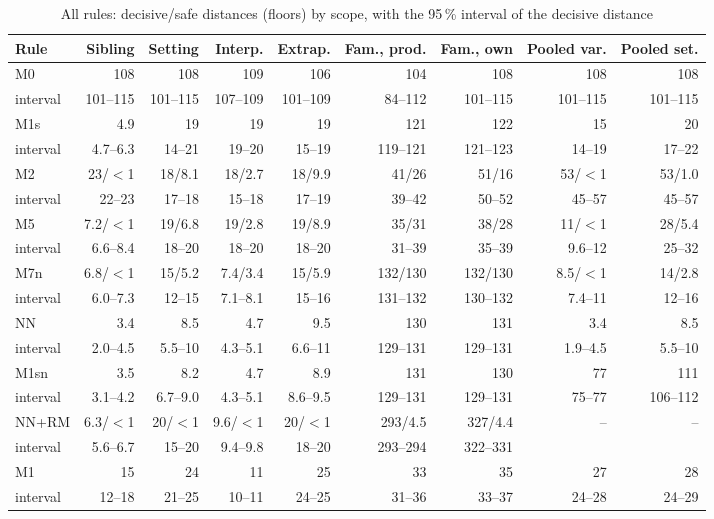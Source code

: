\documentclass[pdflatex,sn-basic]{sn-jnl}
\newcommand{\tabsizesmall}{\footnotesize}
\begin{document}
\FloatBarrier

\begin{table}[p]
\tabsizesmall
\setlength{\tabcolsep}{2pt}
\caption{All rules: decisive/safe distances (floors) by scope, with the 95\,\% interval of the decisive distance}\label{tab:s-all}
\begin{tabular}{@{}lrrrrrrrr@{}}
\toprule
Rule & Sibling & Setting & Interp. & Extrap. & Fam., prod. & Fam., own & Pooled var. & Pooled set. \\
\midrule
M0 & 108 & 108 & 109 & 106 & 104 & 108 & 108 & 108 \\
\quad interval & 101--115 & 101--115 & 107--109 & 101--109 & 84--112 & 101--115 & 101--115 & 101--115 \\
M1s & 4.9 & 19 & 19 & 19 & 121 & 122 & 15 & 20 \\
\quad interval & 4.7--6.3 & 14--21 & 19--20 & 15--19 & 119--121 & 121--123 & 14--19 & 17--22 \\
M2 & 23/$<$1 & 18/8.1 & 18/2.7 & 18/9.9 & 41/26 & 51/16 & 53/$<$1 & 53/1.0 \\
\quad interval & 22--23 & 17--18 & 15--18 & 17--19 & 39--42 & 50--52 & 45--57 & 45--57 \\
M5 & 7.2/$<$1 & 19/6.8 & 19/2.8 & 19/8.9 & 35/31 & 38/28 & 11/$<$1 & 28/5.4 \\
\quad interval & 6.6--8.4 & 18--20 & 18--20 & 18--20 & 31--39 & 35--39 & 9.6--12 & 25--32 \\
M7n & 6.8/$<$1 & 15/5.2 & 7.4/3.4 & 15/5.9 & 132/130 & 132/130 & 8.5/$<$1 & 14/2.8 \\
\quad interval & 6.0--7.3 & 12--15 & 7.1--8.1 & 15--16 & 131--132 & 130--132 & 7.4--11 & 12--16 \\
NN & 3.4 & 8.5 & 4.7 & 9.5 & 130 & 131 & 3.4 & 8.5 \\
\quad interval & 2.0--4.5 & 5.5--10 & 4.3--5.1 & 6.6--11 & 129--131 & 129--131 & 1.9--4.5 & 5.5--10 \\
M1sn & 3.5 & 8.2 & 4.7 & 8.9 & 131 & 130 & 77 & 111 \\
\quad interval & 3.1--4.2 & 6.7--9.0 & 4.3--5.1 & 8.6--9.5 & 129--131 & 129--131 & 75--77 & 106--112 \\
NN+RM & 6.3/$<$1 & 20/$<$1 & 9.6/$<$1 & 20/$<$1 & 293/4.5 & 327/4.4 & -- & -- \\
\quad interval & 5.6--6.7 & 15--20 & 9.4--9.8 & 18--20 & 293--294 & 322--331 &  & \\
M1 & 15 & 24 & 11 & 25 & 33 & 35 & 27 & 28 \\
\quad interval & 12--18 & 21--25 & 10--11 & 24--25 & 31--36 & 33--37 & 24--28 & 24--29 \\

\end{tabular}
\end{table}
\end{document}
